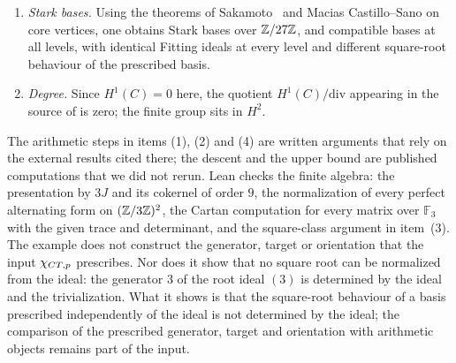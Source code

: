\begin{example}[An ordinary Selmer complex at $p=3$]
\begin{enumerate}
  $2$ modulo $3$, which is impossible.  So every invariant that factors
  through the ideal, including its valuation, takes the same value on the
  two generators, while only one of them lies in the image of the fixed
  squaring map.
\item \emph{Stark bases.}  Using the theorems of
  Sakamoto~\citep{Sakamoto2018} and Macias Castillo--Sano on core
  vertices, one obtains Stark bases over $\mathbb{Z}/27\mathbb{Z}$, and compatible bases
  at all levels, with identical Fitting ideals at every level and
  different square-root behaviour of the prescribed basis.
\item \emph{Degree.}  Since $H^1(C)=0$ here, the quotient
  $H^1(C)/\mathrm{div}$ appearing in the source of
   is zero; the finite group sits in
  $H^2$.
\end{enumerate}
\end{example}

The arithmetic steps in items (1), (2) and (4) are written arguments that
rely on the external results cited there; the descent and the upper bound
are published computations that we did not rerun.  Lean checks the
finite algebra: the presentation by $3J$ and its cokernel of order $9$,
the normalization of every perfect alternating form on $(\mathbb{Z}/3\mathbb{Z})^2$, the
Cartan computation for every matrix over $\mathbb F_3$ with the given
trace and determinant, and the square-class argument in item~(3).  The
example does not construct the generator, target or orientation that the
input $\chi_{CT,p}$ prescribes.  Nor does it show that no square root can be
normalized from the ideal: the generator $3$ of the root ideal $(3)$ is
determined by the ideal and the trivialization.  What it shows is that
the square-root behaviour of a basis prescribed independently of the ideal
is not determined by the ideal; the comparison of the prescribed
generator, target and orientation with arithmetic objects remains part of
the input.
